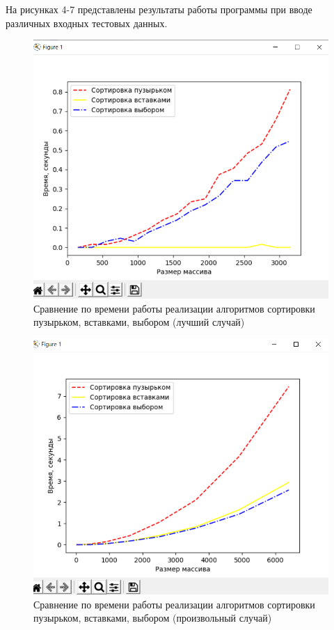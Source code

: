 \documentclass[a4paper,12pt]{article}
\begin{document}
	На рисунках 4-7 представлены результаты работы программы при вводе различных входных тестовых данных.
	
	\begin{figure}[H]
		\centering
		\includegraphics[scale=0.6]{test1.png}
		\captionsetup{justification=centering}
		\caption{Сравнение по времени работы реализации алгоритмов сортировки пузырьком, вставками, выбором (лучший случай)}
		\label{Рис 8}
	\end{figure}
	
	\begin{figure}[H]
		\centering
		\includegraphics[scale=0.6]{test2.png}
		\captionsetup{justification=centering}
		\caption{Сравнение по времени работы реализации алгоритмов сортировки пузырьком, вставками, выбором (произвольный случай)
		}
		\label{Рис 9}
	\end{figure}
	
\end{document}
